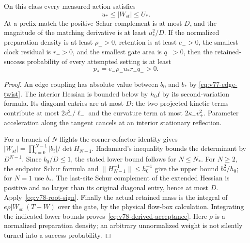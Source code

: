 \begin{proposition}
\label{prop:v78-geometric-bounds}
On this class every measured action satisfies
\begin{equation}\label{eq:v78-billiard-twist}
                    u_*\le |W_{st}|\le U_*.
\end{equation}
At a prefix match the positive Schur complement is at most $D$, and
the magnitude of the matching derivative is at least $u_*^2/D$.
If the normalized preparation density is at least $\rho_->0$, retention
is at least $e_->0$, the smallest clock residual is $r_->0$, and the
smallest gate area is $q_->0$, then the retained-success probability
of every attempted setting is at least
\begin{equation}\label{eq:v78-derived-acceptance}
                         p_*=e_-\rho_-u_*r_-q_->0.
\end{equation}
\end{proposition}
\begin{proof}
An edge coupling has absolute value between $b_0$ and $b_*$ by
\eqref{eq:v77-edge-twist}.  The interior Hessian is bounded below by
$h_0 I$ by its second-variation formula.  Its diagonal entries are at
most $D$: the two projected kinetic terms contribute at most
$2v_+^2/\ell_-$ and the curvature term at most
$2\kappa_+v_+^2$.  Parameter acceleration along the tangent cancels
at an interior stationary reflection.

For a branch of $N$ flights the corner-cofactor identity gives
$|W_{st}|=\prod_{i=0}^{N-1}|b_i|/\det H_{N-1}$.
Hadamard's inequality bounds the determinant by $D^{N-1}$.
Since $b_0/D\le1$, the stated lower bound follows for $N\le N_*$.
For $N\ge2$, the endpoint Schur formula and
$\|H_{N-1}^{-1}\|\le h_0^{-1}$ give the upper bound
$b_*^2/h_0$; for $N=1$ use $b_*$.  The last-site Schur complement
of the extended Hessian is positive and no larger than its original
diagonal entry, hence at most $D$.  Apply~\eqref{eq:v78-root-sign}.
Finally the actual retained mass is the integral of
$e\rho|W_{st}|(T-W)$ over the gate, by the physical flow-box calculation.
Integrating the indicated lower bounds proves~\eqref{eq:v78-derived-acceptance}.
Here $\rho$ is a normalized preparation density; an arbitrary unnormalized
weight is not silently turned into a success probability.
\end{proof}

